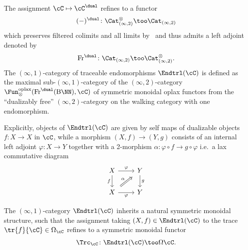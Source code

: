 \begin{cons}
The assignment $\cC\mapsto \cC^{\dual}$ refines to a functor
\[ (-)^{\dual}\colon \Cat^{\otimes}_{(\infty,2)} \too \Cat_{(\infty,2)}\]
which preserves filtered colimits and all limits by~\cite[Proposition 4.6.1.11]{Lurie2017}
and thus admits a left adjoint denoted by
\[ \rm{Fr}^{\dual}\colon \Cat_{(\infty,2)} \too \Cat^{\otimes}_{(\infty,2)}.\]
The $(\infty,1)$-category of traceable endomorphisms $\Endtrl(\cC)$ is defined as the maximal sub-$(\infty,1)$-category of the $(\infty,2)$-category $\Fun^{\rm{oplax}}_{\otimes}(\rm{Fr}^{\dual}(B\NN), \cC)$
of symmetric monoidal oplax functors from the ``dualizably free'' $(\infty,2)$-category
on the walking category with one endomorphism.
\end{cons}

Explicitly, objects of $\Endtrl(\cC)$ are given by self
maps of dualizable objects $f\colon X \to X$ in $\cC$, while a morphism $(X,f) \to (Y,g)$
consists of an internal left adjoint $\varphi\colon X \to Y$ together with a 2-morphism
$\alpha \colon \varphi \circ f \to g \circ \varphi $ i.e.~a lax commutative diagram
\[\begin{tikzcd}
    X & Y \\
    X & Y \arrow["\varphi", from=1-1, to=1-2] \arrow["f"', from=1-1, to=2-1] \arrow["g", from=1-2, to=2-2] \arrow["\alpha", shorten <=4pt, shorten >=4pt, Rightarrow, from=2-1, to=1-2] \arrow["\varphi"', from=2-1, to=2-2]
  \end{tikzcd}\]

\begin{thm}\cite[Theorem 1.7.]{Hoyois_Scherotzke_Sibilla2017}\label{thm: trace functor}
  The $(\infty,1)$-category $\Endtrl(\cC)$ inherits a natural
  symmetric monoidal structure, such that the assignment taking $(X,f) \in \Endtrl(\cC)$ to the
  trace $\tr{f}{\cC} \in \Omega_{\cC}$ refines to a symmetric monoidal functor
  \[ \Trc_{\cC}\colon \Endtrl(\cC) \too \Omega \cC.\]
\end{thm}

